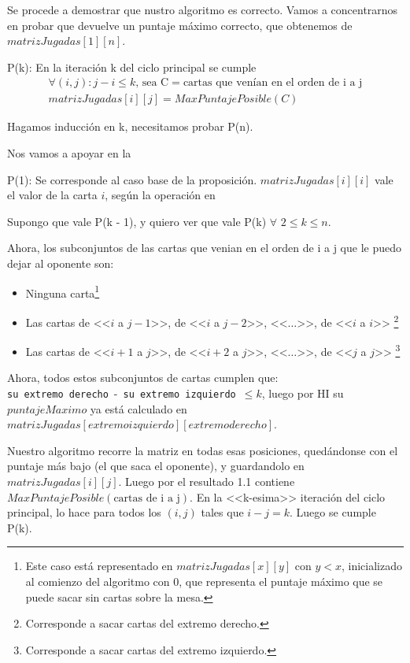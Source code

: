 \documentclass[11pt, a4paper, twoside]{article}
\begin{document}
{}

Se procede a demostrar que nustro algoritmo es correcto. Vamos a concentrarnos
en probar que devuelve un puntaje máximo correcto, que obtenemos de
$matrizJugadas[1][n]$.


P(k): En la iteración k del ciclo principal se cumple
\begin{align*}
\forall (i, j) : j - i \leq k \text{, sea C} = \text{cartas que venían en el orden de i a j} \\
matrizJugadas[i][j] = MaxPuntajePosible( C ) 
\end{align*}

Hagamos inducción en k, necesitamos probar P(n).

Nos vamos a apoyar en la 

P(1): Se corresponde al caso base de la proposición. $matrizJugadas[i][i]$ vale
el valor de la carta $i$, según la operación en 


Supongo que vale P(k - 1), y quiero ver que vale P(k) $\forall$ $2 \leq k \leq n$.

Ahora, los subconjuntos de las cartas que venian en el orden de i a j que le
puedo dejar al oponente son:

\begin{itemize}

  \item Ninguna carta\footnote{Este caso está representado en
$matrizJugadas[x][y]$ con $y < x$, inicializado al comienzo del algoritmo con 0,
que representa el puntaje máximo que se puede sacar sin cartas sobre la mesa.}

  \item Las cartas 
    de <<$i$ a $j-1$>>, 
    de <<$i$ a $j-2$>>,
    <<$\dots$>>, 
    de <<$i$ a $i$>>
    \footnote{Corresponde a sacar cartas del extremo derecho.}

  \item Las cartas 
    de <<$i+1$ a $j$>>, 
    de <<$i+2$ a $j$>>,
    <<$\dots$>>,
    de <<$j$ a $j$>>
    \footnote{Corresponde a sacar cartas del extremo izquierdo.}

\end{itemize}

Ahora, todos estos subconjuntos de cartas cumplen que:\\
\mbox{\texttt{su extremo derecho} - \texttt{su extremo izquierdo} $\leq k$},
luego por HI su $puntajeMaximo$ ya está calculado en
$matrizJugadas[extremo izquierdo][extremo derecho]$.

Nuestro algoritmo recorre la matriz en todas esas posiciones, quedándonse con el
puntaje más bajo (el que saca el oponente), y guardandolo en
$matrizJugadas[i][j]$. Luego por el resultado 1.1 contiene
$MaxPuntajePosible(\text{cartas de i a j})$. En la <<k-esima>> iteración del
ciclo principal, lo hace para todos los $(i, j)$ tales que $i - j = k$. Luego se
cumple P(k).
\end{document}
